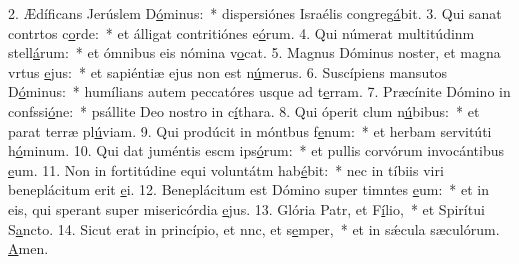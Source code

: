 2. Ædíficans Jerúslem D\uline{ó}minus:~* dispersiónes Israélis congreg\uline{á}bit.
3. Qui sanat contrtos c\uline{o}rde:~* et álligat contritiónes e\uline{ó}rum.
4. Qui númerat multitúdinm stell\uline{á}rum:~* et ómnibus eis nómina v\uline{o}cat.
5. Magnus Dóminus noster, et magna vrtus \uline{e}jus:~* et sapiéntiæ ejus non est n\uline{ú}merus.
6. Suscípiens mansutos D\uline{ó}minus:~* humílians autem peccatóres usque ad t\uline{e}rram.
7. Præcínite Dómino in confssi\uline{ó}ne:~* psállite Deo nostro in c\uline{í}thara.
8. Qui óperit clum n\uline{ú}bibus:~* et parat terræ pl\uline{ú}viam.
9. Qui prodúcit in móntbus f\uline{e}num:~* et herbam servitúti h\uline{ó}minum.
10. Qui dat juméntis escm ips\uline{ó}rum:~* et pullis corvórum invocántibus \uline{e}um.
11. Non in fortitúdine equi voluntátm hab\uline{é}bit:~* nec in tíbiis viri beneplácitum erit \uline{e}i.
12. Beneplácitum est Dómino super timntes \uline{e}um:~* et in eis, qui sperant super misericórdia \uline{e}jus.
13. Glória Patr, et F\uline{í}lio,~* et Spirítui S\uline{a}ncto.
14. Sicut erat in princípio, et nnc, et s\uline{e}mper,~* et in sǽcula sæculórum. \uline{A}men.
